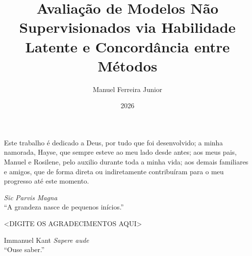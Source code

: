 \documentclass{ufpethesis}
\institute{Centro de Informática}
\title{Avaliação de Modelos Não Supervisionados via Habilidade Latente e Concordância entre Métodos}
\date{2026}
\author{Manuel Ferreira Junior}
\begin{document}
\frontmatter

\frontpage

\presentationpage

\begin{dedicatory}
Este trabalho é dedicado a Deus, por tudo que foi desenvolvido; a minha namorada, Hayse, que sempre esteve ao meu lado desde antes; aos meus pais, Manuel e Rosilene, pelo auxilio durante toda a minha vida; aos demais familiares e amigos, que de forma direta ou indiretamente contribuíram para o meu progresso até este momento.

\vspace{0.5cm}

\textit{ Sic Parvis Magna}\\
\small “A grandeza nasce de pequenos inícios.”
\end{dedicatory}

\acknowledgements
<DIGITE OS AGRADECIMENTOS AQUI>

\begin{epigraph}[]{Immanuel Kant}
\textit{Sapere aude}\\
\small “Ouse saber.”
\end{epigraph}
\end{document}
